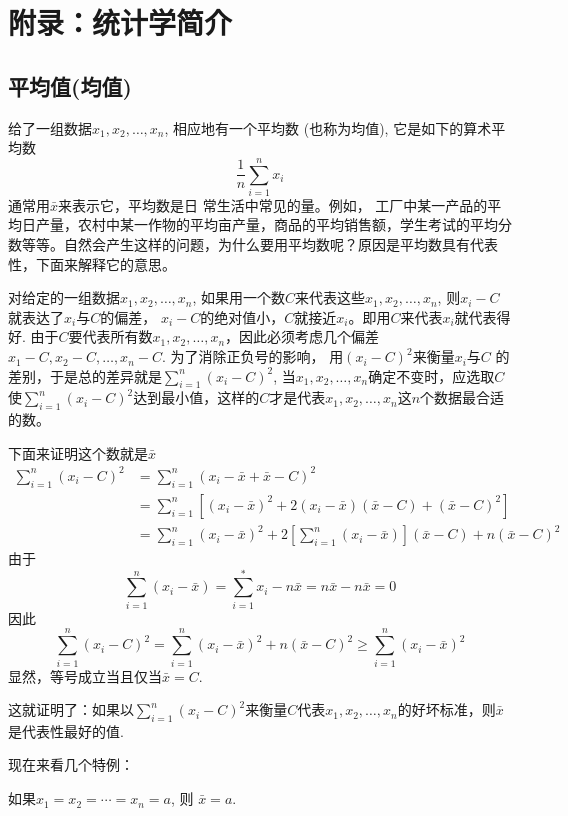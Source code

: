 \chapter{附录：统计学简介}

\section*{平均值(均值)}

给了一组数据$x_1,x_2,\ldots,x_n$, 相应地有一个平均数
(也称为均值), 它是如下的算术平均数
\[\frac{1}{n} \sum_{i=1}^nx_i\]
通常用$\bar x$来表示它，平均数是日 常生活中常见的量。例如， 工厂中某一产品的平均日产量，农村中某一作物的平均亩产量，商品的平均销售额，学生考试的平均分数等等。自然会产生这样的问题，为什么要用平均数呢？原因是平均数具有代表性，下面来解释它的意思。

对给定的一组数据$x_1,x_2,\ldots,x_n$, 如果用一个数$C$来代表这些$x_1,x_2,\ldots,x_n$, 则$x_i-C$就表达了$x_i$与$C$的偏差， $x_i-C$的绝对值小，$C$就接近$x_i$。即用$C$来代表$x_i$就代表得好. 由于$C$要代表所有数$x_1,x_2,\ldots,x_n$，因此必须考虑几个偏差$x_{1}-C,x_{2}-C,\ldots,x_{n}-C$. 为了消除正负号的影响， 用$(x_i-C)^2$来衡量$x_i$与$C$ 的差别，于是总的差异就是$\sum\limits_{i= 1}^{n}\left ( x_{i}- C\right ) ^{2}$, 当$x_{1},x_{2},\ldots,x_{n}$确定不变时，应选取$C$使$\sum\limits_{i= 1}^{n}\left ( x_{i}- C\right ) ^{2}$达到最小值，这样的$C$才是代表$x_{1},x_{2},\ldots,x_{n}$这$n$个数据最合适的数。

下面来证明这个数就是$\bar x$
\[\begin{split}
    \sum_{i=1}^{n} ( x_{i}-C)^{2} &=\sum_{i=1}^{n} ( x_{i}-\bar{x}+\bar{x}-{C} )^{2} \\
    &=\sum_{i=1}^{n}\left[\left( x_{i}-\bar{x}\right) ^{2}+2\left( x_{i}-\bar{x}\right) ( \bar{x}-C)+(\bar{x}-C)^{2}\right]\\
    &=\sum_{i=1}^{n}\left( x_{i}-\bar{x}\right)^{2}+2\left[\sum_{i=1}^{n}\left( x_{i}-\bar{x}\right)\right](\bar{x}-C)+n(\bar{x}-C)^{2}
\end{split}\]
由于
$$\sum_{i=1}^{n} ( x_{i}-\bar{x} ) =\sum_{i=1}^{*} x_{i}-n\bar{x}=n\bar{x}-n\bar{x}=0$$
因此
$$\sum_{i=1}^{n}(x_{i}-C)^{2}=\sum_{i=1}^{n}(x_{i}-\bar{x})^{2}+n(\bar{x}-C)^{2}\ge \sum_{i=1}^{n}(x_{i}-\bar{x})^{2}$$
显然，等号成立当且仅当$\bar x=C$.

这就证明了：如果以$\sum\limits_{i=1}^n(x_i-C)^2$来衡量$C$代表$x_1,
x_{2},\ldots,x_{n}$的好坏标准，则$\bar x$是代表性最好的值.

现在来看几个特例：

\begin{example}
    如果$x_1=x_2=\cdots=x_n=a$, 则 $\bar{x}=a$.
\end{example}


